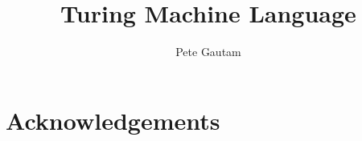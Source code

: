 \documentclass{l4proj}
\begin{document}
\title{Turing Machine Language} 
\author{Pete Gautam}

\maketitle

\begin{abstract}
\end{abstract}

\chapter*{Acknowledgements}
%
%


\def\consentname {Pete Gautam} 
\def\consentdate {27 September 2022} 
\educationalconsent

\tableofcontents







  

%     
%     
%     
%     


\renewcommand{\thechapter}{0} 

\end{document}

